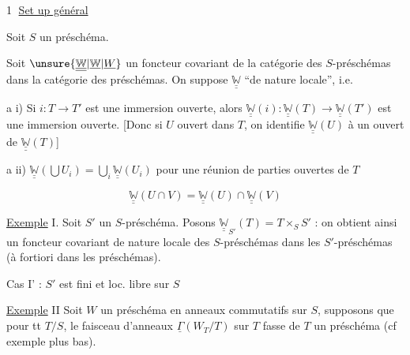 \textcircled{1}
\uline{Set up général}

Soit $S$ un préschéma. 

Soit $\unsure{\underline{\underline{\mathbb W}}|\underline{\mathbb W}|\underline W}$ un foncteur covariant de la catégorie des $S$-préschémas dans la catégorie des  préschémas. On suppose $\underline{\underline{\mathbb W}}$ ``de nature locale'', i.e.

a i) Si $i:T\longrightarrow T'$ est une immersion ouverte, alors $\underline{\underline{\mathbb W}}(i):\underline{\underline{\mathbb W}}(T)\to\underline{\underline{\mathbb W}}(T')$ est une immersion ouverte. [Donc si $U$ ouvert dans $T$, on identifie $\underline{\underline{\mathbb W}}(U)$ à un ouvert de $\underline{\underline{\mathbb W}}(T)$]


a ii) $\underline{\underline{\mathbb W}}(\bigcup U_i)=\bigcup_i\underline{\underline{\mathbb W}}(U_i)$ pour une réunion  de parties ouvertes de $T$

\[
\underline{\underline{\mathbb W}}(U\cap V)=\underline{\underline{\mathbb W}}(U)\cap\underline{\underline{\mathbb W}}(V)\tag*{a iii)}
\]

\uline{Exemple} I. Soit $S'$ un $S$-préschéma. Posons $\underline{\underline{\mathbb W}}_{S'}(T)=T\times_S S'$ : on obtient ainsi  un foncteur covariant de nature locale des $S$-préschémas dans les $S'$-préschémas (à fortiori dans les préschémas).

Cas I' : $S'$ est fini et loc. libre sur $S$

\uline{Exemple} II Soit $W$ un  préschéma en anneaux commutatifs sur $S$, supposons que pour tt $T/S$, le faisceau d'anneaux $\underline\Gamma(W_T/T)$ sur $T$ fasse de $T$ un préschéma (cf exemple plus bas). 
